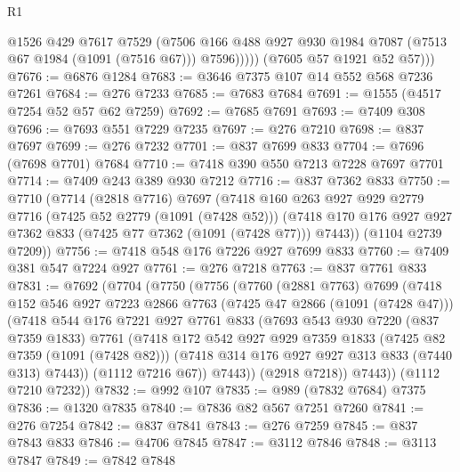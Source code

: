 \begin{lexlean}{R1}
\begin{coremodule}
                @1526
                @429
                @7617
                @7529
                (@7506
                  @166
                  @488
                  @927
                  @930
                  @1984
                  @7087
                  (@7513 @67 @1984 (@1091 (@7516 @67)))
                  @7596)))))
        (@7605 @57 @1921 @52 @57)))
@7676 := @6876 @1284
@7683 := @3646 @7375 @107 @14 @552 @568 @7236 @7261
@7684 := @276 @7233
@7685 := @7683 @7684
@7691 := @1555 (@4517 @7254 @52 @57 @62 @7259)
@7692 := @7685 @7691
@7693 := @7409 @308
@7696 := @7693 @551 @7229 @7235
@7697 := @276 @7210
@7698 := @837 @7697
@7699 := @276 @7232
@7701 := @837 @7699 @833
@7704 := @7696 (@7698 @7701) @7684
@7710 := @7418 @390 @550 @7213 @7228 @7697 @7701
@7714 := @7409 @243 @389 @930 @7212
@7716 := @837 @7362 @833
@7750 := @7710
    (@7714
      (@2818 @7716)
      @7697
      (@7418
        @160
        @263
        @927
        @929
        @2779
        @7716
        (@7425 @52 @2779 (@1091 (@7428 @52)))
        (@7418 @170 @176 @927 @927 @7362 @833 (@7425 @77 @7362 (@1091 (@7428 @77))) @7443))
      (@1104 @2739 @7209))
@7756 := @7418 @548 @176 @7226 @927 @7699 @833
@7760 := @7409 @381 @547 @7224 @927
@7761 := @276 @7218
@7763 := @837 @7761 @833
@7831 := @7692
    (@7704
      (@7750
        (@7756
          (@7760
            (@2881 @7763)
            @7699
            (@7418
              @152
              @546
              @927
              @7223
              @2866
              @7763
              (@7425 @47 @2866 (@1091 (@7428 @47)))
              (@7418
                @544
                @176
                @7221
                @927
                @7761
                @833
                (@7693
                  @543
                  @930
                  @7220
                  (@837 @7359 @1833)
                  @7761
                  (@7418
                    @172
                    @542
                    @927
                    @929
                    @7359
                    @1833
                    (@7425 @82 @7359 (@1091 (@7428 @82)))
                    (@7418 @314 @176 @927 @927 @313 @833 (@7440 @313) @7443))
                  (@1112 @7216 @67))
                @7443))
            (@2918 @7218))
          @7443))
      (@1112 @7210 @7232))
@7832 := @992 @107
@7835 := @989 (@7832 @7684) @7375
@7836 := @1320 @7835
@7840 := @7836 @82 @567 @7251 @7260
@7841 := @276 @7254
@7842 := @837 @7841
@7843 := @276 @7259
@7845 := @837 @7843 @833
@7846 := @4706 @7845
@7847 := @3112 @7846
@7848 := @3113 @7847
@7849 := @7842 @7848

\end{coremodule}
\end{lexlean}

